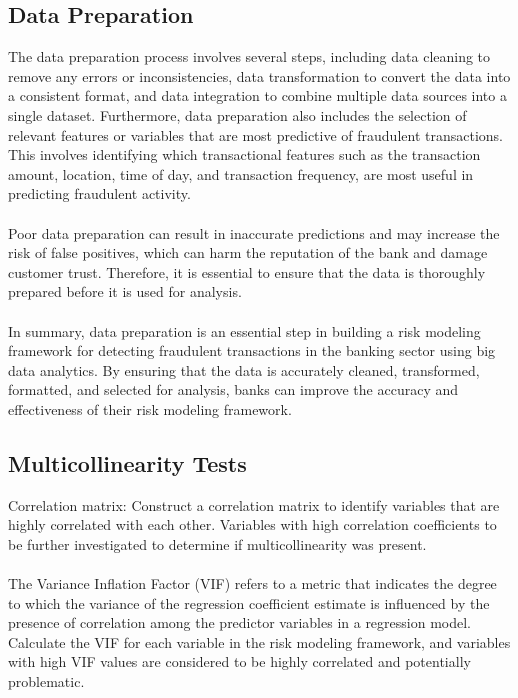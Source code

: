 \subsection{Data Preparation}

The data preparation process involves several steps, including data cleaning to remove any errors or inconsistencies,
 data transformation to convert the data into a consistent format, and data integration to combine multiple data 
 sources into a single dataset. Furthermore, data preparation also includes the selection of relevant features or 
 variables that are most predictive of fraudulent transactions. This involves identifying which transactional 
 features such as the transaction amount, location, time of day, and transaction frequency, are most useful in 
 predicting fraudulent activity.\\\\
Poor data preparation can result in inaccurate predictions and may increase the risk of false positives, which can 
harm the reputation of the bank and damage customer trust. Therefore, it is essential to ensure that the data is 
thoroughly prepared before it is used for analysis.\\\\
In summary, data preparation is an essential step in building a risk modeling framework for detecting fraudulent 
transactions in the banking sector using big data analytics. By ensuring that the data is accurately cleaned, 
transformed, formatted, and selected for analysis, banks can improve the accuracy and effectiveness of their risk 
modeling framework.

\subsection{Multicollinearity Tests}

Correlation matrix: Construct a correlation matrix to identify variables that are highly correlated with each 
other. Variables with high correlation coefficients to be further investigated to determine if multicollinearity was 
present.\\\\
The Variance Inflation Factor (VIF) refers to a metric that indicates the degree to which the variance of the 
regression coefficient estimate is influenced by the presence of correlation among the predictor variables in a 
regression model. Calculate the VIF for each variable in the risk modeling 
framework, and variables with high VIF values are considered to be highly correlated and potentially problematic.

